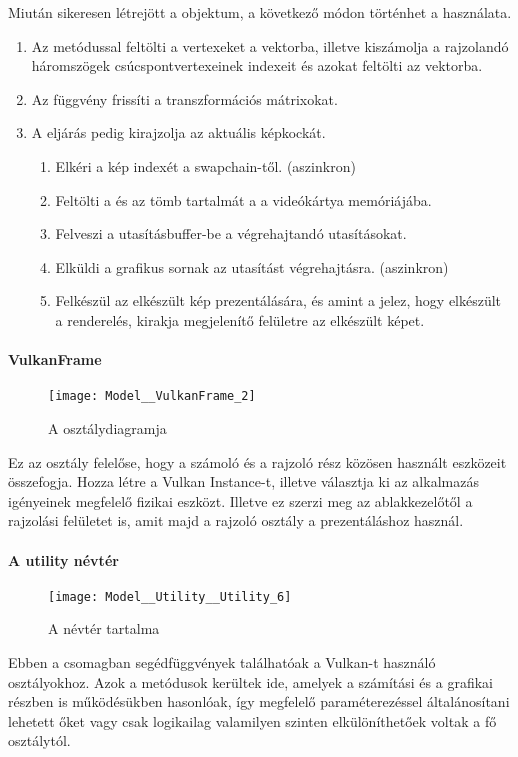Miut\'an sikeresen l\'etrej\"ott a  objektum, a k\"ovetkez\H o m\'odon t\"ort\'enhet a haszn\'alata.
\begin{enumerate}
	\item Az  met\'odussal felt\"olti a vertexeket a  vektorba, illetve kisz\'amolja a rajzoland\'o h\'aromsz\"ogek cs\'ucspontvertexeinek indexeit \'es azokat felt\"olti az  vektorba.
	\item Az  f\"uggv\'eny friss\'iti a transzform\'aci\'os m\'atrixokat.
	\item A  elj\'ar\'as pedig kirajzolja az aktu\'alis k\'epkock\'at.
		\begin{enumerate}
			\item Elk\'eri a k\'ep index\'et a swapchain-t\H ol. (aszinkron)
			\item Felt\"olti a  \'es az  t\"omb tartalm\'at a a vide\'ok\'artya mem\'ori\'aj\'aba.
			\item Felveszi a utas\'it\'asbuffer-be a v\'egrehajtand\'o utas\'it\'asokat.
			\item Elk\"uldi a grafikus sornak az utas\'it\'ast v\'egrehajt\'asra. (aszinkron)
			\item Felk\'esz\"ul az elk\'esz\"ult k\'ep prezent\'al\'as\'ara, \'es amint a  jelez, hogy elk\'esz\"ult a renderel\'es, kirakja megjelen\'it\H o fel\"uletre az elk\'esz\"ult k\'epet.
		\end{enumerate}
\end{enumerate}

\paragraph{VulkanFrame}
\begin{figure}[h]
	\texttt{[image: Model\_\_VulkanFrame\_2]}
	\centering
	\caption{A  oszt\'alydiagramja}
\end{figure}
Ez az oszt\'aly felel\H ose, hogy a sz\'amol\'o \'es a rajzol\'o r\'esz k\"oz\"osen haszn\'alt eszk\"ozeit \"osszefogja. Hozza l\'etre a Vulkan Instance-t, illetve v\'alasztja ki az alkalmaz\'as ig\'enyeinek megfelel\H o fizikai eszk\"ozt. Illetve ez szerzi meg az ablakkezel\H ot\H ol a rajzol\'asi fel\"uletet is, amit majd a rajzol\'o oszt\'aly a prezent\'al\'ashoz haszn\'al.

\paragraph{A utility n\'evt\'er}
\begin{figure}[h]
	\texttt{[image: Model\_\_Utility\_\_Utility\_6]}
	\centering
	\caption{A  n\'evt\'er tartalma}
\end{figure}
Ebben a csomagban seg\'edf\"uggv\'enyek tal\'alhat\'oak a Vulkan-t haszn\'al\'o oszt\'alyokhoz. Azok a met\'odusok ker\"ultek ide, amelyek a sz\'am\'it\'asi \'es a grafikai r\'eszben is m\H uk\"od\'es\"ukben hasonl\'oak, \'igy megfelel\H o param\'eterez\'essel \'altal\'anos\'itani lehetett \H oket vagy csak logikailag valamilyen szinten elk\"ul\"on\'ithet\H oek voltak a f\H o oszt\'alyt\'ol.

